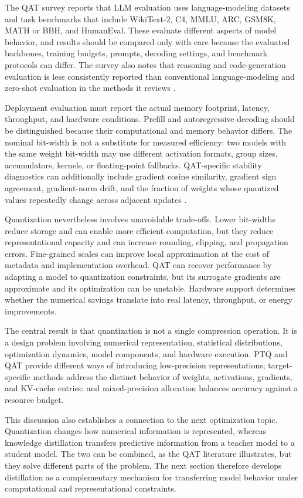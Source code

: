 The QAT survey reports that LLM evaluation uses language-modeling
datasets and task benchmarks that include WikiText-2, C4, MMLU,
ARC, GSM8K, MATH or BBH, and HumanEval. These evaluate different
aspects of model behavior, and results should be compared only with
care because the evaluated backbones, training budgets, prompts,
decoding settings, and benchmark protocols can differ. The survey
also notes that reasoning and code-generation evaluation is less
consistently reported than conventional language-modeling and
zero-shot evaluation in the methods it reviews
\parencite{song2026targetcentricqat}.

Deployment evaluation must report the actual memory footprint,
latency, throughput, and hardware conditions. Prefill and autoregressive
decoding should be distinguished because their computational and
memory behavior differs. The nominal bit-width is not a substitute
for measured efficiency: two models with the same weight bit-width
may use different activation formats, group sizes, accumulators,
kernels, or floating-point fallbacks. QAT-specific stability
diagnostics can additionally include gradient cosine similarity,
gradient sign agreement, gradient-norm drift, and the fraction of
weights whose quantized values repeatedly change across adjacent
updates \parencite{song2026targetcentricqat,chen2026llmquantization}.

Quantization nevertheless involves unavoidable trade-offs. Lower
bit-widths reduce storage and can enable more efficient computation,
but they reduce representational capacity and can increase rounding,
clipping, and propagation errors. Fine-grained scales can improve
local approximation at the cost of metadata and implementation
overhead. QAT can recover performance by adapting a model to
quantization constraints, but its surrogate gradients are approximate
and its optimization can be unstable. Hardware support determines
whether the numerical savings translate into real latency, throughput,
or energy improvements.

The central result is that quantization is not a single compression
operation. It is a design problem involving numerical representation,
statistical distributions, optimization dynamics, model components,
and hardware execution. PTQ and QAT provide different ways of
introducing low-precision representations; target-specific methods
address the distinct behavior of weights, activations, gradients,
and KV-cache entries; and mixed-precision allocation balances
accuracy against a resource budget.

This discussion also establishes a connection to the next optimization
topic. Quantization changes how numerical information is represented,
whereas knowledge distillation transfers predictive information from
a teacher model to a student model. The two can be combined, as the
QAT literature illustrates, but they solve different parts of the
problem. The next section therefore develops distillation as a
complementary mechanism for transferring model behavior under
computational and representational constraints.
